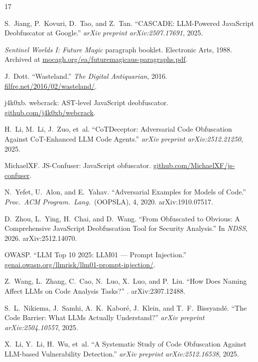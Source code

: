 \documentclass[11pt]{article}
\begin{document}
\begin{thebibliography}{17}

S.~Jiang, P.~Kovuri, D.~Tao, and Z.~Tan.
\newblock ``CASCADE: LLM-Powered JavaScript Deobfuscator at Google.''
\newblock \emph{arXiv preprint arXiv:2507.17691}, 2025.

\emph{Sentinel Worlds I: Future Magic} paragraph booklet.
\newblock Electronic Arts, 1988.
\newblock Archived at \url{mocagh.org/ea/futuremagicaus-paragraphs.pdf}.

J.~Dott.
\newblock ``Wasteland.''
\newblock \emph{The Digital Antiquarian}, 2016.
\newblock \url{filfre.net/2016/02/wasteland/}.

j4k0xb.
\newblock webcrack: AST-level JavaScript deobfuscator.
\newblock \url{github.com/j4k0xb/webcrack}.

H.~Li, M.~Li, J.~Zuo, et~al.
\newblock ``CoTDeceptor: Adversarial Code Obfuscation Against CoT-Enhanced LLM Code Agents.''
\newblock \emph{arXiv preprint arXiv:2512.21250}, 2025.

MichaelXF.
\newblock JS-Confuser: JavaScript obfuscator.
\newblock \url{github.com/MichaelXF/js-confuser}.

N.~Yefet, U.~Alon, and E.~Yahav.
\newblock ``Adversarial Examples for Models of Code.''
\newblock \emph{Proc.\ ACM Program.\ Lang.}\ (OOPSLA), 4, 2020.
\newblock arXiv:1910.07517.

D.~Zhou, L.~Ying, H.~Chai, and D.~Wang.
\newblock ``From Obfuscated to Obvious: A Comprehensive JavaScript Deobfuscation Tool for Security Analysis.''
\newblock In \emph{NDSS}, 2026.
\newblock arXiv:2512.14070.

OWASP.
\newblock ``LLM Top 10 2025: LLM01 --- Prompt Injection.''
\newblock \url{genai.owasp.org/llmrisk/llm01-prompt-injection/}.

Z.~Wang, L.~Zhang, C.~Cao, N.~Luo, X.~Luo, and P.~Liu.
\newblock ``How Does Naming Affect LLMs on Code Analysis Tasks?''
. arXiv:2307.12488.

S.~L.~Nikiema, J.~Samhi, A.~K.~Kabor\'{e}, J.~Klein, and T.~F.~Bissyand\'{e}.
\newblock ``The Code Barrier: What LLMs Actually Understand?''
\newblock \emph{arXiv preprint arXiv:2504.10557}, 2025.

X.~Li, Y.~Li, H.~Wu, et~al.
\newblock ``A Systematic Study of Code Obfuscation Against LLM-based Vulnerability Detection.''
\newblock \emph{arXiv preprint arXiv:2512.16538}, 2025.


\end{thebibliography}
\end{document}
